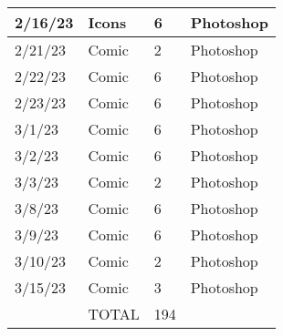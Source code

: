 \begin{longtable}{|p{1.5cm}|p{5.5cm}|p{1.2cm}|p{3.2cm}|}
	2/16/23 & Icons & 6 & Photoshop \\ \hline
	2/21/23 & Comic & 2 & Photoshop \\ \hline
	2/22/23 & Comic & 6 & Photoshop \\ \hline
	2/23/23 & Comic & 6 & Photoshop \\ \hline
	3/1/23 & Comic & 6 & Photoshop \\ \hline
	3/2/23 & Comic & 6 & Photoshop \\ \hline
	3/3/23 & Comic & 2 & Photoshop \\ \hline
	3/8/23 & Comic & 6 & Photoshop \\ \hline
	3/9/23 & Comic & 6 & Photoshop \\ \hline
	3/10/23 & Comic & 2 & Photoshop \\ \hline
	3/15/23 & Comic & 3 & Photoshop \\ \hline
	~ & TOTAL & 194 & ~ \\ \hline
\end{longtable}